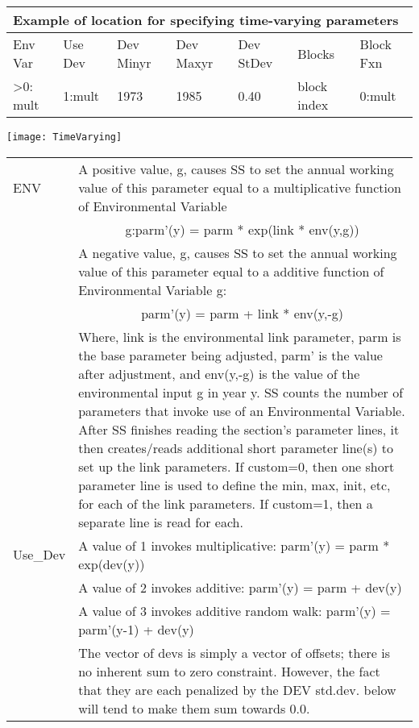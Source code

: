 \begin{center}
	\begin{longtable}{p{2cm} p{2cm} p{2cm} p{2cm} p{2cm} p{2.25cm} p{1.75cm}}
		\multicolumn{7}{l}{Example of location for specifying time-varying parameters}\\
		\hline
		Env Var & Use Dev & Dev Minyr & Dev Maxyr & Dev StDev & Blocks & Block Fxn\\
		\hline
		>0: mult & 1:mult & 1973 & 1985 & 0.40 & block index & 0:mult\\
		\hline
	\end{longtable}
\end{center}
\begin{center}
	\texttt{[image: TimeVarying]}
\end{center}
\begin{center}
	\begin{longtable}{p{2.5cm} p{13cm}}
		\hline
		ENV & A positive value, g, causes SS to set the annual working value of this parameter equal to a multiplicative function of Environmental Variable\\
		    & \multicolumn{1}{c}{g:parm’(y) = parm * exp(link * env(y,g))} \\
			& A negative value, g, causes SS to set the annual working value of this parameter equal to a additive function of Environmental Variable g:\\
		    & \multicolumn{1}{c}{parm’(y) = parm + link * env(y,-g)}\\
			& Where, link is the environmental link parameter, parm is the base parameter being adjusted, parm’ is the value after adjustment, and env(y,-g) is the value of the environmental input g in year y. SS counts the number of parameters that invoke use of an Environmental Variable.  After SS finishes reading the section’s parameter lines, it then creates/reads additional short parameter line(s) to set up the link parameters.  If custom=0, then one short parameter line is used to define the min, max, init, etc, for each of the link parameters.  If custom=1, then a separate line is read for each.\\
		\hline
		Use\_Dev & A value of 1 invokes multiplicative:  parm’(y) = parm * exp(dev(y))\\
			& A value of 2 invokes additive:  parm’(y) = parm + dev(y)\\
			& A value of 3 invokes additive random walk:  parm’(y) = parm’(y-1) + dev(y)\\
		    & The vector of devs is simply a vector of offsets; there is no inherent sum to zero constraint.  However, the fact that they are each penalized by the DEV std.dev. below will tend to make them sum towards 0.0.\\

\end{longtable}
\end{center}
